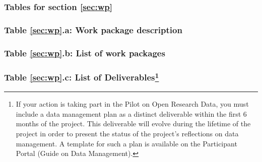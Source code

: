 

\subsubsection*{Tables for section \ref*{sec:wp}}\label{sec:workpackages}
\subsubsection*{Table \ref*{sec:wp}.a: Work package description}\label{sec:workpackages_description}

\begin{workplan}

%
\end{workplan}

\clearpage
\subsubsection*{Table \ref*{sec:wp}.b: List of work packages}\label{sec:workpackages_list}
\wpfig[label=fig:staffeffort,caption=Summary of Staff Efforts]

\clearpage
\subsubsection*{Table \ref*{sec:wp}.c: List of Deliverables\footnote{If your action is taking part in the Pilot on Open Research Data, you must include a data management plan as a distinct deliverable within the first 6 months of the project. This deliverable will evolve during the lifetime of the project in order to present the status of the project's reflections on data management. A template for such a plan is available on the Participant Portal (Guide on Data Management).}}\label{sec:deliverables}

